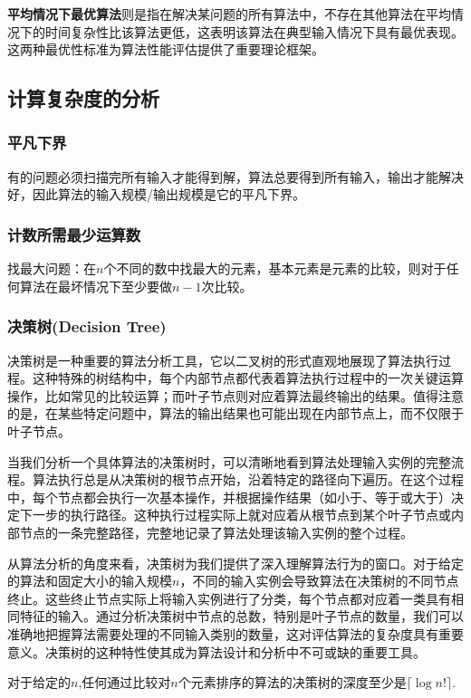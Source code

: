 \documentclass[./../main.tex]{subfiles}
\begin{document}
\textbf{平均情况下最优算法}则是指在解决某问题的所有算法中，不存在其他算法在平均情况下的时间复杂性比该算法更低，这表明该算法在典型输入情况下具有最优表现。这两种最优性标准为算法性能评估提供了重要理论框架。

\subsection{计算复杂度的分析}
\subsubsection{平凡下界}
有的问题必须扫描完所有输入才能得到解，算法总要得到所有输入，输出才能解决好，因此算法的输入规模/输出规模是它的平凡下界。

\subsubsection{计数所需最少运算数}
找最大问题：在$n$个不同的数中找最大的元素，基本元素是元素的比较，则对于任何算法在最坏情况下至少要做$n-1$次比较。

\subsubsection{决策树(Decision Tree)}
决策树是一种重要的算法分析工具，它以二叉树的形式直观地展现了算法执行过程。这种特殊的树结构中，每个内部节点都代表着算法执行过程中的一次关键运算操作，比如常见的比较运算；而叶子节点则对应着算法最终输出的结果。值得注意的是，在某些特定问题中，算法的输出结果也可能出现在内部节点上，而不仅限于叶子节点。

当我们分析一个具体算法的决策树时，可以清晰地看到算法处理输入实例的完整流程。算法执行总是从决策树的根节点开始，沿着特定的路径向下遍历。在这个过程中，每个节点都会执行一次基本操作，并根据操作结果（如小于、等于或大于）决定下一步的执行路径。这种执行过程实际上就对应着从根节点到某个叶子节点或内部节点的一条完整路径，完整地记录了算法处理该输入实例的整个过程。

从算法分析的角度来看，决策树为我们提供了深入理解算法行为的窗口。对于给定的算法和固定大小的输入规模$n$，不同的输入实例会导致算法在决策树的不同节点终止。这些终止节点实际上将输入实例进行了分类，每个节点都对应着一类具有相同特征的输入。通过分析决策树中节点的总数，特别是叶子节点的数量，我们可以准确地把握算法需要处理的不同输入类别的数量，这对评估算法的复杂度具有重要意义。决策树的这种特性使其成为算法设计和分析中不可或缺的重要工具。

对于给定的$n$,任何通过比较对$n$个元素排序的算法的决策树的深度至少是$\lceil\log n!\rceil$.
\end{document}
